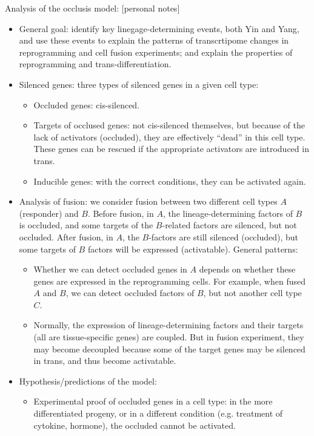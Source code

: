 \documentclass{report}
\begin{document}
Analysis of the occlusis model: [personal notes] 
\begin{itemize}
	\item General goal: identify key linegage-determining events, both Yin and Yang, and use these events to explain the patterns of transcrtipome changes in reprogramming and cell fusion experiments; and explain the properties of reprogramming and trans-differentiation. 
	
	\item Silenced genes: three types of silenced genes in a given cell type: 
	\begin{itemize}
		\item Occluded genes: cis-silenced. 
		\item Targets of occlused genes: not cis-silenced themselves, but because of the lack of activators (occluded), they are effectively ``dead'' in this cell type. These genes can be rescued if the appropriate activators are introduced in trans.  
		\item Inducible genes: with the correct conditions, they can be activated again. 
	\end{itemize}
	
	\item Analysis of fusion: we consider fusion between two different cell types $A$ (responder) and $B$. Before fusion, in $A$, the lineage-determining factors of $B$ is occluded, and some targets of the $B$-related factors are silenced, but not occluded. After fusion, in $A$, the $B$-factors are still silenced (occluded), but some targets of $B$ factors will be expressed (activatable). General patterns: 
	\begin{itemize}
		\item Whether we can detect occluded genes in $A$ depends on whether these genes are expressed in the reprogramming cells. For example, when fused $A$ and $B$, we can detect occluded factors of $B$, but not another cell type $C$. 
		\item Normally, the expression of lineage-determining factors and their targets (all are tissue-specific genes) are coupled. But in fusion experiment, they may become decoupled because some of the target genes may be silenced in trans, and thus become activatable. 
	\end{itemize}
	
	\item Hypothesis/predictions of the model: 
	\begin{itemize}
		\item Experimental proof of occluded genes in a cell type: in the more differentiated progeny, or in a different condition (e.g. treatment of cytokine, hormone), the occluded cannot be activated.
	\end{itemize}
\end{itemize}
\end{document}
